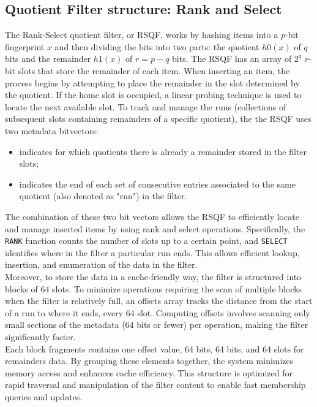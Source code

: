 \subsection{Quotient Filter structure: Rank and Select}
The Rank-Select quotient filter, or \gls{RSQF}, works by hashing items into a $p$-bit fingerprint $x$ and then dividing the bits into two parts: the quotient $h0(x)$ of $q$ bits and the remainder $h1(x)$ of $r = p - q$ bits. The RSQF has an array of $2^q$ $r$-bit slots that store the remainder of each item. When inserting an item, the process begins by attempting to place the remainder in the slot determined by the quotient. If the home slot is occupied, a linear probing technique is used to locate the next available slot.
To track and manage the runs (collections of subsequent slots containing remainders of a specific quotient), the the RSQF uses two metadata bitvectors:
\begin{itemize}
	\item[\occs] indicates for which quotients there is already a remainder stored in the filter slots;
	\item[\rends] indicates the end of each set of consecutive entries associated to the same quotient (also denoted as "run") in the filter.
\end{itemize}
The combination of these two bit vectors allows the RSQF to efficiently locate and manage inserted items by using rank and select operations. Specifically, the \texttt{RANK} function counts the number of \occ slots up to a certain point, and  \texttt{SELECT} identifies where in the filter a particular run ends. This allows efficient lookup, insertion, and enumeration of the data in the filter.\\
Moreover, to store the data in a cache-friendly way, the filter is structured into blocks of 64 slots. To minimize operations requiring the scan of multiple blocks when the filter is relatively full, an offsets array tracks the distance from the start of a run to where it ends, every 64 slot. Computing offsets involves scanning only small sections of the metadata (64 bits or fewer) per operation, making the filter significantly faster.\\
Each block fragments contains one offset value, 64 \occs bits, 64 \rends bits, and 64 slots for remainders data. By grouping these elements together, the system minimizes memory access and enhances cache efficiency. This structure is optimized for rapid traversal and manipulation of the filter content to enable fast membership queries and updates.\\
